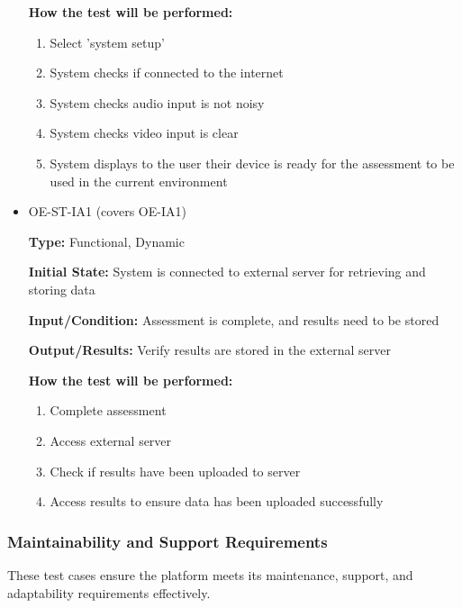 \documentclass[12pt, titlepage]{article}
\begin{document}
\begin{itemize}
\begin{mdframed}[linewidth=0.5mm]
      \textbf{How the test will be performed:}
      \begin{enumerate}[noitemsep]
        \item Select 'system setup'
        \item System checks if connected to the internet
        \item System checks audio input is not noisy
        \item System checks video input is clear
        \item System displays to the user their device is ready for the assessment to be used in the current environment
      \end{enumerate}
  \end{mdframed}
  \item OE-ST-IA1 (covers OE-IA1)
  \begin{mdframed}[linewidth=0.5mm]
      \textbf{Type:} Functional, Dynamic \par
      \textbf{Initial State:} System is connected to external server for retrieving and storing data \par
      \textbf{Input/Condition:} Assessment is complete, and results need to be stored\par
      \textbf{Output/Results:} Verify results are stored in the external server \par
      \textbf{How the test will be performed:}
      \begin{enumerate}[noitemsep]
        \item Complete assessment
        \item Access external server
        \item Check if results have been uploaded to server
        \item Access results to ensure data has been uploaded successfully
      \end{enumerate}
  \end{mdframed}
\end{itemize}

\subsubsection{Maintainability and Support Requirements}

These test cases ensure the platform meets its maintenance, support, and adaptability requirements effectively.
\end{document}
